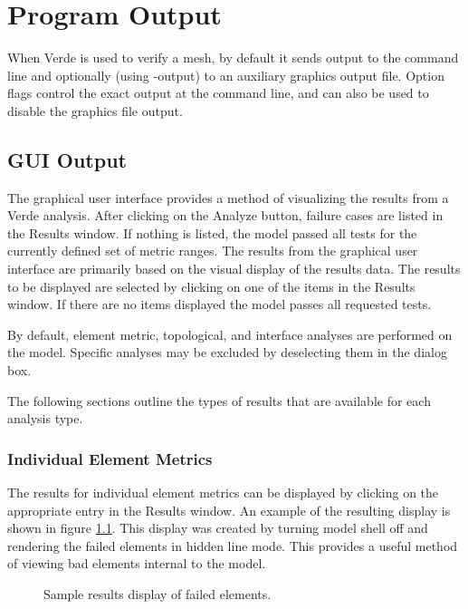\documentclass[10pt]{report}
\begin{document}
\chapter{Program Output}
\label{sec:output}

When Verde is used to verify a mesh, by default it sends output to the 
command line and optionally (using -output) to an auxiliary graphics 
output file.  Option flags control the exact output at the command 
line, and can also be used to disable the graphics file output.


\section{GUI Output}
\label{gui_output}
The graphical user interface provides a method of
visualizing the results from a Verde analysis.  After clicking
on the Analyze button, failure cases are listed in the Results
window.  If nothing is listed, the model passed all tests for
the currently defined set of metric ranges.
The results from the graphical user interface are 
primarily based on the visual display of the results data.
The results to be displayed are selected by clicking on one
of the items in the Results window. If there are no items
displayed the model passes all requested tests.

By default, element metric, topological, and interface analyses
are performed on the model.  Specific analyses may be excluded 
by deselecting them in the  
dialog box.

The following sections outline the types of results that
are available for each analysis type.

\subsection{Individual Element Metrics} 
The results for individual element metrics can be displayed
by clicking on the appropriate entry in the Results window.
An example of the resulting display is shown in figure 
\ref{fig:element_metrics}.  This display was created by turning
model shell off and rendering the failed elements in hidden
line mode.  This provides a useful method of viewing bad elements
internal to the model.

\htmlrule
\begin{figure}[tbhp]
  \begin{center}
              {}
    \caption{Sample results display of failed elements.}
    \label{fig:element_metrics}
  \end{center}
\end{figure}     
\htmlrule
\end{document}

